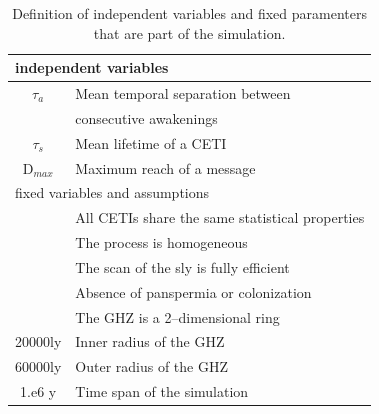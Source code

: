 \documentclass[crop]{CSLB}%
\begin{document}
 
\setlength{\tabcolsep}{10pt}
\begin{table}
\centering
\begin{tabular}{cl}
\hline
   \multicolumn{2}{l}{independent variables} \\
\hline
   $\tau_{a}$ & Mean temporal separation between\\
              & consecutive awakenings \\
   $\tau_{s}$ & Mean lifetime of a CETI \\
   D$_{max}$ & Maximum reach of a message \\
\hline
\multicolumn{2}{l}{fixed variables and assumptions} \\
\hline
   & All CETIs share the same statistical properties\\
   & The process is homogeneous \\
   & The scan of the sly is fully efficient\\
   & Absence of panspermia or colonization \\
   & The GHZ is a 2--dimensional ring \\
20000ly    & Inner radius of the GHZ \\
60000ly    & Outer radius of the GHZ \\
1.e6 y    & Time span of the simulation \\

\hline
\end{tabular}
\caption{Definition of independent variables and fixed paramenters 
   that are part of the simulation.}
\label{T_simu}
\end{table}
 
\end{document}

